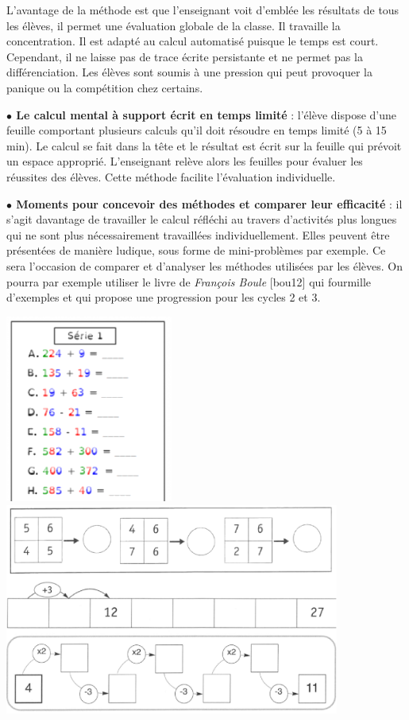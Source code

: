 \medskip

L'avantage de la méthode est que l'enseignant voit d’emblée les résultats de tous les élèves, il permet une évaluation globale de la classe. Il travaille la concentration. Il est adapté au calcul automatisé puisque le temps est court. Cependant, il ne laisse pas de trace écrite persistante et ne permet pas la différenciation. Les élèves sont soumis à une pression qui peut provoquer la panique ou la compétition chez certains. \smallskip

\textbf{$\bullet$ Le calcul mental à support écrit en temps limité} : l'élève dispose d'une feuille comportant plusieurs calculs qu'il doit résoudre en temps limité (5 à 15 min). Le calcul se fait dans la tête et le résultat est écrit sur la feuille qui prévoit un espace approprié. L'enseignant relève alors les feuilles pour évaluer les réussites des élèves. Cette méthode facilite l'évaluation individuelle. \smallskip

\textbf{$\bullet$ Moments pour concevoir des méthodes et comparer leur efficacité} : il s'agit davantage de travailler le calcul réfléchi au travers d'activités plus longues qui ne sont plus nécessairement travaillées individuellement. Elles peuvent être présentées de manière ludique, sous forme de \og mini-problèmes \fg{} par exemple. Ce sera l'occasion de comparer et d'analyser les méthodes utilisées par les élèves. On pourra par exemple utiliser le livre  \fg{} de {\it François Boule} [bou12] qui fourmille d'exemples et qui propose une progression pour les cycles 2 et 3.

\begin{center}
   \includegraphics[width=5.5cm]{Nombres_et_calculs_did/Images/Num2_cours_calcul_mental}
   \includegraphics[width=11cm]{Nombres_et_calculs_did/Images/Num2_cours_Boule}
\end{center}


